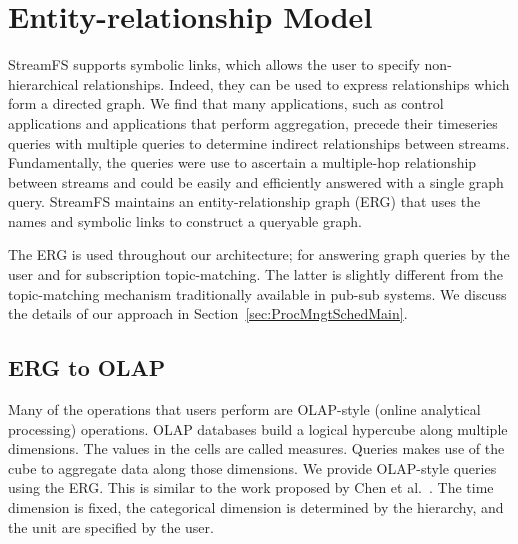 


\section{Entity-relationship Model}

StreamFS supports symbolic links, which allows the user to specify non-hierarchical relationships.  Indeed, they can 
be used to express relationships which form a directed graph.  We find that many applications, such as control 
applications and applications that perform aggregation, precede their timeseries queries with multiple queries
to determine indirect relationships between streams.  Fundamentally, the queries were use to ascertain a multiple-hop
relationship between streams and could be easily and efficiently answered with a single graph query.
StreamFS maintains an entity-relationship graph (ERG) that uses the names and symbolic links to construct a queryable 
graph.

The ERG is used throughout our architecture; for answering graph queries by the user and for subscription topic-matching.
The latter is slightly different from the topic-matching mechanism traditionally available in pub-sub systems. 
We discuss the details of our approach in Section~\ref{sec:ProcMngtSchedMain}.


\subsection{ERG to OLAP}
\label{sec:erg2olap}

Many of the operations that users perform are OLAP-style (online analytical processing) operations\cite{Gray1996}. 
OLAP databases build a logical hypercube along multiple dimensions.  The values in the cells are called 
measures.  Queries makes use of the cube to aggregate data along those dimensions.
We provide OLAP-style queries using the ERG.  This is similar to the work proposed by Chen et al.~\cite{Chen2008_olapgraph}.
The time dimension is fixed, the categorical dimension is determined by the hierarchy, and the unit are specified
by the user.

